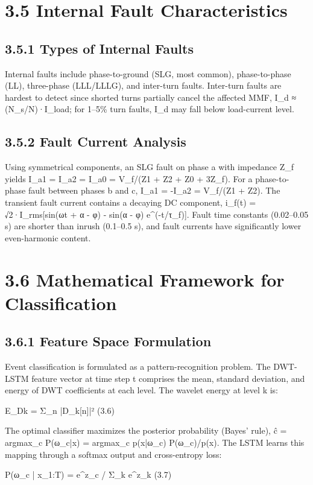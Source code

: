 \section{3.5  Internal Fault Characteristics}

\subsection{3.5.1  Types of Internal Faults}
Internal faults include phase-to-ground (SLG, most common), phase-to-phase (LL), three-phase (LLL/LLLG), and inter-turn faults. Inter-turn faults are hardest to detect since shorted turns partially cancel the affected MMF, I\_d ≈ (N\_s/N)·I\_load; for 1--5\% turn faults, I\_d may fall below load-current level.


\subsection{3.5.2  Fault Current Analysis}
Using symmetrical components, an SLG fault on phase a with impedance Z\_f yields I\_a1 = I\_a2 = I\_a0 = V\_f/(Z1 + Z2 + Z0 + 3Z\_f). For a phase-to-phase fault between phases b and c, I\_a1 = -I\_a2 = V\_f/(Z1 + Z2). The transient fault current contains a decaying DC component, i\_f(t) = √2·I\_rms[sin(ωt + α - φ) - sin(α - φ) e^(-t/τ\_f)]. Fault time constants (0.02--0.05 s) are shorter than inrush (0.1--0.5 s), and fault currents have significantly lower even-harmonic content.


\section{3.6  Mathematical Framework for Classification}

\subsection{3.6.1  Feature Space Formulation}
Event classification is formulated as a pattern-recognition problem. The DWT-LSTM feature vector at time step t comprises the mean, standard deviation, and energy of DWT coefficients at each level. The wavelet energy at level k is:

E\_{Dk} = Σ\_n |D\_k[n]|²	(3.6)

The optimal classifier maximizes the posterior probability (Bayes' rule), ĉ = argmax\_c P(ω\_c|x) = argmax\_c p(x|ω\_c) P(ω\_c)/p(x). The LSTM learns this mapping through a softmax output and cross-entropy loss:

P(ω\_c | x\_{1:T}) = e^{z\_c} / Σ\_k e^{z\_k}	(3.7)


